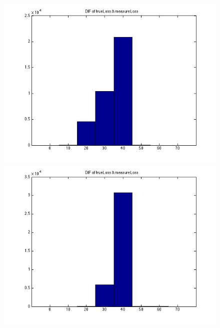 \documentclass[10pt,conference]{IEEEtran}
\begin{document}
\begin{figure}[htbp]
\centering
\begin{minipage}[t]{0.2\textwidth}
	\centering
	\includegraphics[scale=0.2]{wallbreakpoint0-1}
\end{minipage}
\begin{minipage}[t]{0.2\textwidth}
	\centering
	\includegraphics[scale=0.2]{wallbreakpoint0-2}
\end{minipage}
\begin{minipage}[t]{0.2\textwidth}
	\centering

\end{minipage}
\end{figure}
\end{document}
